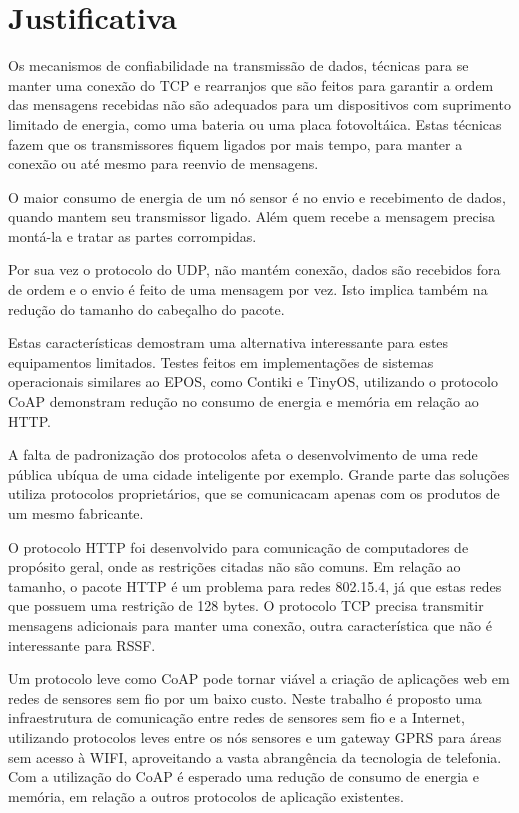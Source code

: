 \section{Justificativa}

Os mecanismos de confiabilidade na transmiss\~ao de dados, t\'ecnicas para se manter uma conex\~ao do TCP e rearranjos que s\~ao feitos para garantir a ordem das mensagens recebidas n\~ao s\~ao adequados para um dispositivos com suprimento limitado de energia, como uma bateria ou uma placa fotovolt\'aica. Estas t\'ecnicas fazem que os transmissores fiquem ligados por mais tempo, para manter a conex\~ao ou at\'e mesmo para reenvio de mensagens.

O maior consumo de energia de um n\'o sensor \'e no envio e recebimento de dados, quando mantem seu transmissor ligado. Al\'em quem recebe a mensagem precisa mont\'a-la e tratar as partes corrompidas.

Por sua vez o protocolo do UDP, n\~ao mant\'em conex\~ao, dados s\~ao recebidos fora de ordem e o envio \'e feito de uma mensagem por vez. Isto implica tamb\'em na redu\c{c}\~ao do tamanho do cabe\c{c}alho do pacote.

Estas caracter\'isticas demostram uma alternativa interessante para estes equipamentos limitados. Testes feitos em implementa\c{c}\~oes de sistemas operacionais similares ao EPOS, como Contiki e TinyOS, utilizando o protocolo CoAP demonstram redu\c{c}\~ao no consumo de energia e mem\'oria em rela\c{c}\~ao ao HTTP.\cite{transportApp}

A falta de padroniza\c{c}\~ao dos protocolos afeta o desenvolvimento de uma rede p\'ublica ub\'iqua de uma cidade inteligente por exemplo. Grande parte das solu\c{c}\~oes utiliza protocolos propriet\'arios, que se comunicacam apenas com os produtos de um mesmo fabricante.

O protocolo HTTP foi desenvolvido para comunica\c{c}\~ao de computadores de prop\'osito geral, onde as restri\c{c}\~oes citadas n\~ao s\~ao comuns. Em rela\c{c}\~ao ao tamanho, o pacote HTTP \'e um problema para redes 802.15.4, j\'a que estas redes que possuem uma restri\c{c}\~ao de 128 bytes. O protocolo TCP precisa transmitir mensagens adicionais para manter uma conex\~ao, outra caracter\'istica que n\~ao \'e interessante para RSSF.

Um protocolo leve como CoAP pode tornar vi\'avel a cria\c{c}\~ao de aplica\-\c{c}\~oes web em redes de sensores sem fio por um baixo custo. Neste trabalho \'e proposto uma infraestrutura de comunica\c{c}\~ao entre redes de sensores sem fio e a Internet, utilizando protocolos leves entre os n\'os sensores e um gateway GPRS para \'areas sem acesso \`a WIFI, aproveitando a vasta abrang\^encia da tecnologia de telefonia. Com a utiliza\c{c}\~ao do CoAP \'e esperado uma redu\c{c}\~ao de consumo de energia e mem\'oria, em rela\c{c}\~ao a outros protocolos de aplica\c{c}\~ao existentes.

